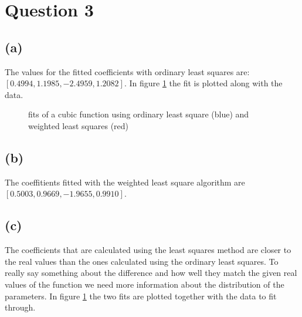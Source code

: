 \documentclass[a4paper]{article}
\begin{document}
\section*{Question 3}

\subsection*{(a)}
The values for the fitted coefficients with ordinary least squares are: $[0.4994, 1.1985, -2.4959, 1.2082]$. In figure \ref{fig:fit-3} the fit is plotted along with the data. 
\begin{figure}
	\centering
	
	\caption{fits of a cubic function using ordinary least square (blue) and weighted least squares (red)}
	\label{fig:fit-3}
\end{figure}

\subsection*{(b)}
The coeffitients fitted with the weighted least square algorithm are $[0.5003, 0.9669, -1.9655, 0.9910]$.

\subsection*{(c)}
The coefficients that are calculated using the least squares method are closer to the real values than the ones calculated using the ordinary least squares. To really say something about the difference and how well they match the given real values of the function we need more information about the distribution of the parameters.
In figure \ref{fig:fit-3} the two fits are plotted together with the data to fit through.
\end{document}
